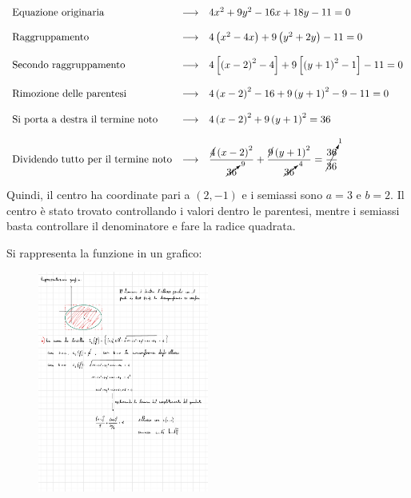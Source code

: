 \documentclass[a4paper]{article}
\begin{document}
	\begin{equation*}
		\begin{array}{lll}
			\text{Equazione originaria}				 & \longrightarrow & 4x^{2} + 9y^{2} - 16x +18y - 11 = 0 \\
			&& \\
			\text{Raggruppamento}					 & \longrightarrow & 4\left(x^{2} - 4x\right) + 9\left(y^{2} + 2y\right) - 11 = 0 \\
			&& \\
			\text{Secondo raggruppamento}			 & \longrightarrow & 4\left[\left(x - 2\right)^{2} - 4\right] + 9\left[\left(y + 1\right)^{2} - 1\right] - 11 = 0 \\
			&& \\
			\text{Rimozione delle parentesi}		 & \longrightarrow & 4\left(x-2\right)^{2} - 16 + 9\left(y+1\right)^{2} - 9 - 11 = 0 \\
			&& \\
			\text{Si porta a destra il termine noto} & \longrightarrow & 4\left(x-2\right)^{2} + 9\left(y+1\right)^{2} = 36 \\
			&& \\
			\text{Dividendo tutto per il termine noto} & \longrightarrow & \dfrac{\cancel{4} \left(x-2\right)^{2}}{\cancelto{9}{36}} + \dfrac{\cancel{9}\left(y+1\right)^{2}}{\cancelto{4}{36}} = \cancelto{1}{\dfrac{36}{36}}
		\end{array}
	\end{equation*}

	\noindent
	Quindi, il centro ha coordinate pari a $\left(2,-1\right)$ e i semiassi sono $a = 3$ e $b = 2$. Il centro è stato trovato controllando i valori dentro le parentesi, mentre i semiassi basta controllare il denominatore e fare la radice quadrata.\newline
	
	\noindent
	Si rappresenta la funzione in un grafico:
	
	\begin{figure}[!htp]
		\centering
		\includegraphics[width=0.5\textwidth]{img/ellisse_iperbole_traslata.pdf}
	\end{figure}
\end{document}
